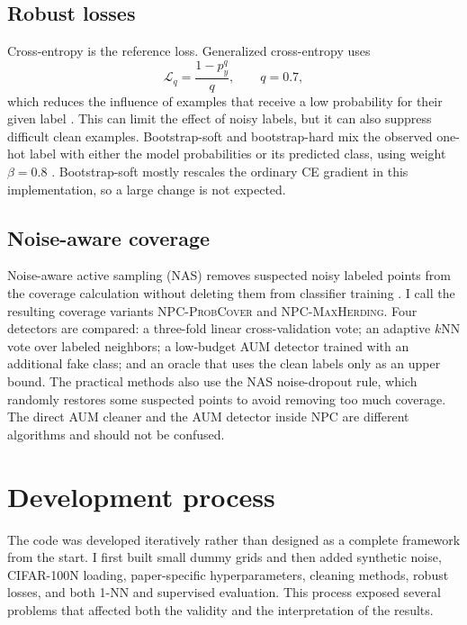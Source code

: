 \documentclass[10pt,twocolumn]{article}
\newcommand{\pc}{\textnormal{\textsc{ProbCover}}}
\newcommand{\mh}{\textnormal{\textsc{MaxHerding}}}
\newcommand{\npc}{\textnormal{\textsc{NPC}}}
\begin{document}
\subsection{Robust losses}

Cross-entropy is the reference loss. Generalized cross-entropy uses
\begin{equation}
  \mathcal L_q=\frac{1-p_y^q}{q}, \qquad q=0.7,
\end{equation}
which reduces the influence of examples that receive a low probability for
their given label \cite{zhang2018gce}. This can limit the effect of noisy labels,
but it can also suppress difficult clean examples. Bootstrap-soft and
bootstrap-hard mix the observed one-hot label with either the model
probabilities or its predicted class, using weight $\beta=0.8$
\cite{reed2015bootstrapping}. Bootstrap-soft mostly rescales the ordinary CE
gradient in this implementation, so a large change is not expected.

\subsection{Noise-aware coverage}

Noise-aware active sampling (NAS) removes suspected noisy labeled points from
the coverage calculation without deleting them from classifier training
\cite{shafir2025noisy}. I call the resulting coverage variants \npc{-\pc{}}
and \npc{-\mh{}}. Four detectors are compared: a three-fold linear
cross-validation vote; an adaptive $k$NN vote over labeled neighbors; a
low-budget AUM detector trained with an additional fake class; and an oracle
that uses the clean labels only as an upper bound. The practical methods also
use the NAS noise-dropout rule, which randomly restores some suspected points
to avoid removing too much coverage. The direct AUM cleaner and the AUM
detector inside \npc{} are different algorithms and should not be confused.

\section{Development process}

The code was developed iteratively rather than designed as a complete framework
from the start. I first built small dummy grids and then added synthetic noise, CIFAR-100N loading,
paper-specific hyperparameters, cleaning methods, robust losses, and both 1-NN
and supervised evaluation. This process exposed several problems that affected
both the validity and the interpretation of the results.
\end{document}
